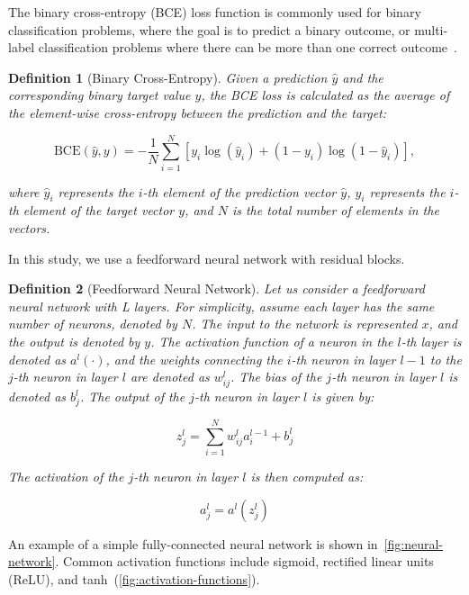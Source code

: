 \documentclass[ppgc,diss,english]{iiufrgs}
\newtheorem{definition}{Definition}
\begin{document}
The binary cross-entropy (BCE) loss function is commonly used for binary classification problems, where the goal is to predict a binary outcome, or multi-label classification problems where there can be more than one correct outcome~\cite{Tsoumakas.etal/2007}.
\begin{definition}[Binary Cross-Entropy]\label{def:mse}
Given a prediction $\hat{y}$ and the corresponding binary target value $y$, the BCE loss is calculated as the average of the element-wise cross-entropy between the prediction and the target:

$$\text{BCE}(\hat{y}, y) = -\frac{1}{N} \sum_{i=1}^{N} \left[y_i \log(\hat{y}_i) + (1 - y_i) \log(1 - \hat{y}_i)\right],$$

where $\hat{y}_i$ represents the $i$-th element of the prediction vector $\hat{y}$, $y_i$ represents the $i$-th element of the target vector $y$, and $N$ is the total number of elements in the vectors.
\end{definition}

In this study, we use a feedforward neural network with residual blocks.

\begin{definition}[Feedforward Neural Network]
Let us consider a feedforward neural network with L layers. For simplicity, assume each layer has the same number of neurons, denoted by $N$. The input to the network is represented $x$, and the output is denoted by $y$. The activation function of a neuron in the $l$-th layer is denoted as $a^l(\cdot)$, and the weights connecting the $i$-th neuron in layer $l-1$ to the $j$-th neuron in layer $l$ are denoted as $w^{l}_{ij}$. The bias of the $j$-th neuron in layer $l$ is denoted as $b^{l}_{j}$. The output of the $j$-th neuron in layer $l$ is given by:

$$z^{l}_{j} = \sum_{i=1}^{N} w^{l}_{ij} a^{l-1}_{i} + b^{l}_{j}$$

The activation of the $j$-th neuron in layer $l$ is then computed as:

$$a^{l}_{j} = a^{l}(z^{l}_{j})$$
\end{definition}

An example of a simple fully-connected neural network is shown in~\cref{fig:neural-network}.
Common activation functions include sigmoid, rectified linear units (ReLU), and tanh~(\cref{fig:activation-functions}).
\end{document}
